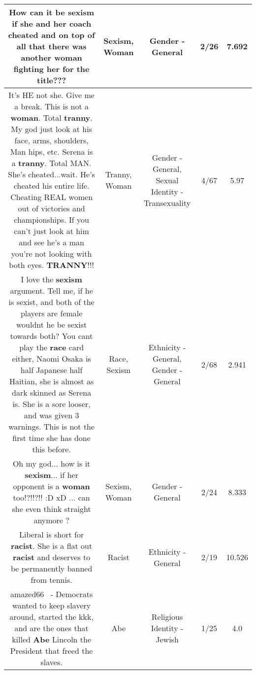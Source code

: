 \documentclass[11pt]{article}
\newlength\mylength
\begin{document}
\begin{center}
\begin{longtable}{|C{.65\mylength}|C{.30\mylength}|C{.12\mylength}|C{.12\mylength}|C{.12\mylength}|}
  \small How can it be \textbf{sexism} if she and her coach cheated and on top of all that there was another \textbf{woman} fighting her for the title???\normalsize   & Sexism, Woman & Gender - General & 2/26 & 7.692 \\  \hline
  \small It's HE not she. Give me a break. This is not a \textbf{woman}. Total \textbf{tranny}. My god just look at his face, arms, shoulders, Man hips, etc. Serena is a \textbf{tranny}. Total MAN. She's cheated...wait. He's cheated his entire life. Cheating REAL women out of victories and championships. If you can't just look at him and see he's a man you're not looking with both eyes. \textbf{TRANNY}!!!\normalsize   & Tranny, Woman & Gender - General, Sexual Identity - Transexuality & 4/67 & 5.97 \\  \hline
  \small I love the \textbf{sexism} argument. Tell me, if he is sexist, and both of the players are female wouldnt he be sexist towards both? You cant play the \textbf{race} card either, Naomi Osaka is half Japanese half Haitian, she is almost as dark skinned as Serena is. She is a sore looser, and was given 3 warnings. This is not the first time she has done this before.\normalsize   & Race, Sexism & Ethnicity - General, Gender - General & 2/68 & 2.941 \\  \hline
  \small Oh my god... how is it \textbf{sexism}... if her opponent is a \textbf{woman} too!?!!?!! :D xD ... can she even think straight anymore ?\normalsize   & Sexism, Woman & Gender - General & 2/24 & 8.333 \\  \hline
  \small Liberal is short for \textbf{racist}. She is a flat out \textbf{racist} and deserves to be permanently banned from tennis.\normalsize   & Racist & Ethnicity - General & 2/19 & 10.526 \\  \hline
  \small amazed66  - Democrats wanted to keep slavery around, started the kkk, and are the ones that killed \textbf{Abe} Lincoln the President that freed the slaves.\normalsize   & Abe & Religious Identity - Jewish & 1/25 & 4.0 \\  \hline

\end{longtable}
\end{center}
\end{document}
